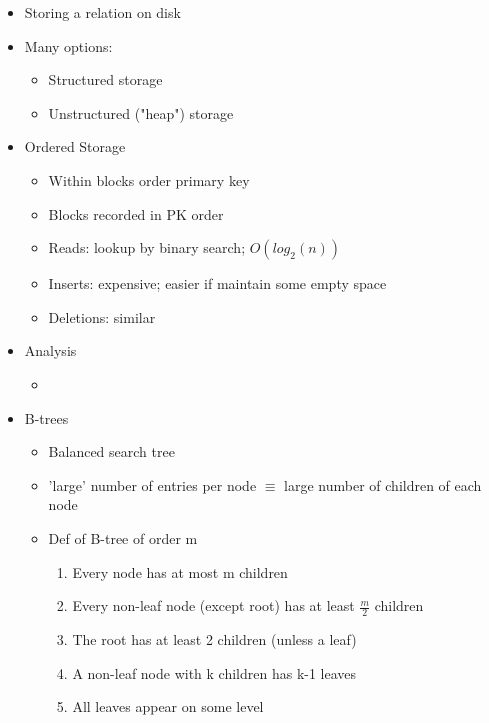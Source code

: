 \documentclass[12pt]{article}
\begin{document}
		\begin{itemize}
			\item
				Storing a relation on disk
			\item
				Many options:
			\begin{itemize}
				\item
					Structured storage
				\item
					Unstructured ("heap") storage
			\end{itemize}
			\item
				Ordered Storage
				\begin{itemize}
					\item
						Within blocks order primary key
					\item
						Blocks recorded in PK order
					\item
						Reads: lookup by binary search; $O(log_2(n))$
					\item
						Inserts: expensive; easier if maintain some empty space
					\item
						Deletions: similar
				\end{itemize}
			\item
				Analysis
				\begin{itemize}
					\item
				\end{itemize}
			\item
				B-trees
				\begin{itemize}
					\item
						Balanced search tree
					\item
						'large' number of entries per node $\equiv$ large number of children of each node
					\item
						Def of B-tree of order m
						\begin{enumerate}
							\item
								Every node has at most m children
							\item
								Every non-leaf node (except root) has at least $\frac{m}{2}$ children
							\item
								The root has at least 2 children (unless a leaf)
							\item
								A non-leaf node with k children has k-1 leaves
							\item
								All leaves appear on some level
						\end{enumerate}
				\end{itemize}
		\end{itemize}
\end{document}
